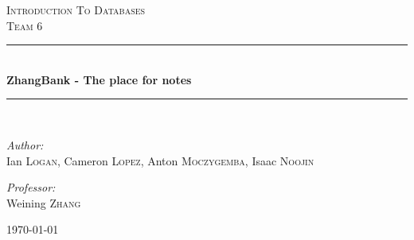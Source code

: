 \begin{titlepage}
 
\begin{center}
\newcommand{\HRule}{\rule{\linewidth}{0.5mm}} 
 
 
\textsc{\LARGE Introduction To Databases}\\[1.5cm]
 
\textsc{\Large Team 6}\\[0.5cm]
 
\HRule \\[0.4cm]
{ \huge \bfseries ZhangBank - The place for notes}\\[0.4cm]
 
\HRule \\[1.5cm]
 
\begin{minipage}{0.4\textwidth}
\begin{flushleft} \large
\emph{Author:}\\
Ian \textsc{Logan}, Cameron \textsc{Lopez}, Anton
\textsc{Moczygemba}, Isaac \textsc{Noojin}
\end{flushleft}
\end{minipage}
\begin{minipage}{0.4\textwidth}
\begin{flushright} \large
\emph{Professor:} \\
Weining \textsc{Zhang}
\end{flushright}
\end{minipage}
 
\vfill
 
{\large \today}
 
\end{center}
 
\end{titlepage}